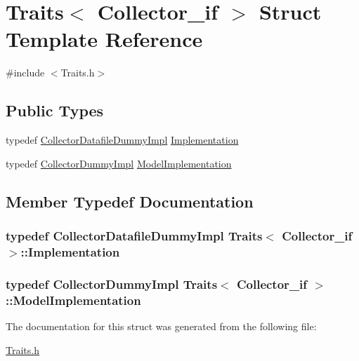 \hypertarget{struct_traits_3_01_collector__if_01_4}{}\section{Traits$<$ Collector\+\_\+if $>$ Struct Template Reference}
\label{struct_traits_3_01_collector__if_01_4}


{\ttfamily \#include $<$Traits.\+h$>$}

\subsection*{Public Types}
\begin{DoxyCompactItemize}
\item 
typedef \hyperlink{class_collector_datafile_dummy_impl}{Collector\+Datafile\+Dummy\+Impl} \hyperlink{struct_traits_3_01_collector__if_01_4_a1249b74ca4c9d384f5cb8e0fcd7cbbaf}{Implementation}
\item 
typedef \hyperlink{class_collector_dummy_impl}{Collector\+Dummy\+Impl} \hyperlink{struct_traits_3_01_collector__if_01_4_a5b91142859719dd887efdbb8bfd455d6}{Model\+Implementation}
\end{DoxyCompactItemize}


\subsection{Member Typedef Documentation}
\subsubsection[{\texorpdfstring{Implementation}{Implementation}}]{\setlength{\rightskip}{0pt plus 5cm}typedef {\bf Collector\+Datafile\+Dummy\+Impl} {\bf Traits}$<$ {\bf Collector\+\_\+if} $>$\+::{\bf Implementation}}\hypertarget{struct_traits_3_01_collector__if_01_4_a1249b74ca4c9d384f5cb8e0fcd7cbbaf}{}\label{struct_traits_3_01_collector__if_01_4_a1249b74ca4c9d384f5cb8e0fcd7cbbaf}
\subsubsection[{\texorpdfstring{Model\+Implementation}{ModelImplementation}}]{\setlength{\rightskip}{0pt plus 5cm}typedef {\bf Collector\+Dummy\+Impl} {\bf Traits}$<$ {\bf Collector\+\_\+if} $>$\+::{\bf Model\+Implementation}}\hypertarget{struct_traits_3_01_collector__if_01_4_a5b91142859719dd887efdbb8bfd455d6}{}\label{struct_traits_3_01_collector__if_01_4_a5b91142859719dd887efdbb8bfd455d6}


The documentation for this struct was generated from the following file\+:\begin{DoxyCompactItemize}
\item 
\hyperlink{_traits_8h}{Traits.\+h}\end{DoxyCompactItemize}
